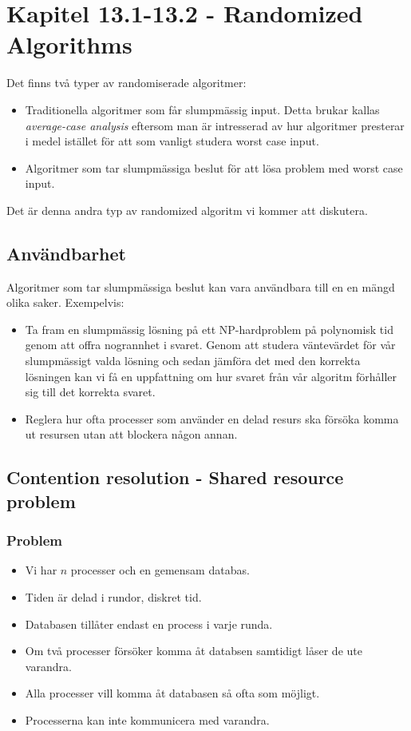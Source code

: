 \documentclass[a4paper]{report}
\begin{document}
\section{Kapitel 13.1-13.2 - Randomized Algorithms}

Det finns två typer av randomiserade algoritmer:
\begin{itemize}
	\item Traditionella algoritmer som får slumpmässig input. Detta brukar kallas \emph{average-case analysis} eftersom man är intresserad av hur algoritmer presterar i medel istället för att som vanligt studera worst case input.
	\item Algoritmer som tar slumpmässiga beslut för att lösa problem med worst case input.
\end{itemize}

Det är denna andra typ av randomized algoritm vi kommer att diskutera.

\subsection{Användbarhet}
Algoritmer som tar slumpmässiga beslut kan vara användbara till en en mängd olika saker. Exempelvis:
\begin{itemize}
	\item Ta fram en slumpmässig lösning på ett NP-hardproblem på
	polynomisk tid genom att offra nogrannhet i svaret. Genom att studera
	väntevärdet för vår slumpmässigt valda lösning och sedan jämföra det
	med den korrekta lösningen kan vi få en uppfattning om hur svaret från
	vår algoritm förhåller sig till det korrekta svaret.

	\item Reglera hur ofta processer som använder en delad resurs ska
	försöka komma ut resursen utan att blockera någon annan.
\end{itemize}

\subsection{Contention resolution - Shared resource problem}

\subsubsection{Problem}
\begin{itemize}
	\item Vi har $n$ processer och en gemensam databas.
	\item Tiden är delad i rundor, diskret tid.
	\item Databasen tillåter endast en process i varje runda.
	\item Om två processer försöker komma åt databsen samtidigt låser de ute varandra.
	\item Alla processer vill komma åt databasen så ofta som möjligt.
	\item Processerna kan inte kommunicera med varandra.
\end{itemize}
       
\end{document}

